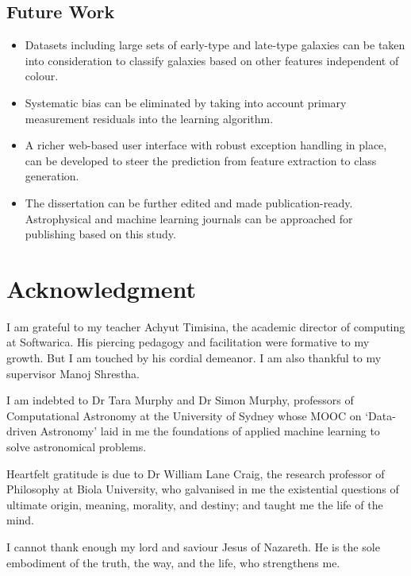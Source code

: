 \subsection{Future Work}
\begin{itemize}
	\item Datasets including large sets of early-type and late-type galaxies can be taken into consideration to classify galaxies based on other features independent of colour.
	\item Systematic bias can be eliminated by taking into account primary measurement residuals into the learning algorithm.
	\item A richer web-based user interface with robust exception handling in place, can be developed to steer the prediction from feature extraction to class generation.
	\item The dissertation can be further edited and made publication-ready. Astrophysical and machine learning journals can be approached for publishing based on this study.
\end{itemize}

\section{Acknowledgment}
I am grateful to my teacher Achyut Timisina, the academic director of computing at Softwarica. His piercing pedagogy and facilitation were formative to my growth. But I am touched by his cordial demeanor. I am also thankful to my supervisor Manoj Shrestha.

I am indebted to Dr Tara Murphy and Dr Simon Murphy, professors of Computational Astronomy at the University of Sydney whose MOOC on `Data-driven Astronomy' laid in me the foundations of applied machine learning to solve astronomical problems.

Heartfelt gratitude is due to Dr William Lane Craig, the research professor of Philosophy at Biola University, who galvanised in me the existential questions of ultimate origin, meaning, morality, and destiny; and taught me the life of the mind.

I cannot thank enough my lord and saviour Jesus of Nazareth. He is the sole embodiment of the truth, the way, and the life, who strengthens me.